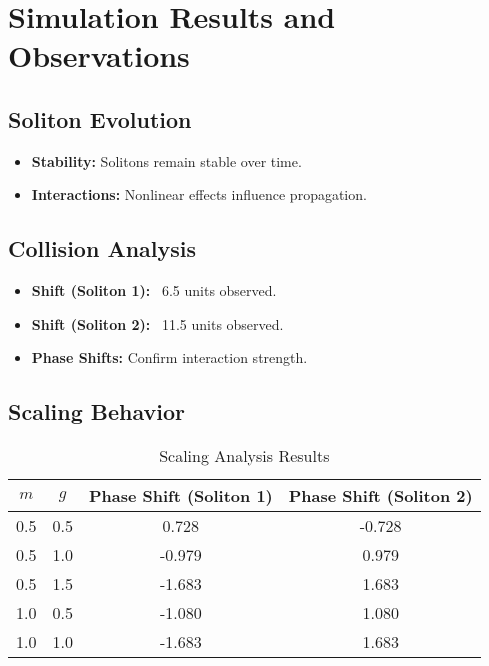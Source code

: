 \documentclass{article}
\begin{document}
\section{Simulation Results and Observations}
\subsection{Soliton Evolution}
\begin{itemize}
    \item \textbf{Stability:} Solitons remain stable over time.
    \item \textbf{Interactions:} Nonlinear effects influence propagation.
\end{itemize}

\subsection{Collision Analysis}
\begin{itemize}
    \item \textbf{Shift (Soliton 1):} ~6.5 units observed.
    \item \textbf{Shift (Soliton 2):} ~11.5 units observed.
    \item \textbf{Phase Shifts:} Confirm interaction strength.
\end{itemize}

\subsection{Scaling Behavior}
\begin{table}[h]
    \centering
    \begin{tabular}{cc|cc}
        \toprule
        \(m\) & \(g\) & Phase Shift (Soliton 1) & Phase Shift (Soliton 2) \\
        \midrule
        0.5 & 0.5 & 0.728 & -0.728 \\
        0.5 & 1.0 & -0.979 & 0.979 \\
        0.5 & 1.5 & -1.683 & 1.683 \\
        1.0 & 0.5 & -1.080 & 1.080 \\
        1.0 & 1.0 & -1.683 & 1.683 \\
        \bottomrule
    \end{tabular}
    \caption{Scaling Analysis Results}
    \label{tab:scaling}
\end{table}
\end{document}
